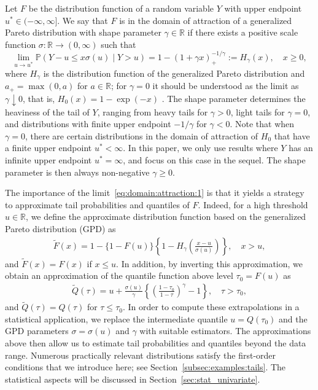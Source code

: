 \documentclass{statsoc}
\theoremstyle{break}
\renewcommand{\P}{\mathbb P}
\newcommand{\tauzero}{\tau_0}
\newcommand{\beam}{\begin{eqnarray}}
\newcommand{\eeam}{\end{eqnarray}\noindent}
\begin{document}
Let $F$ be the distribution function of a random variable $Y$ with upper endpoint $u^* \in (-\infty, \infty]$.
We say that $F$ is in the domain of attraction of a generalized Pareto distribution 
with shape parameter $\gamma \in \mathbb{R}$ 
if there exists a positive scale function $\sigma :\mathbb{R}\to (0,\infty)$ such that 
\begin{equation}
    \label{eq:domain:attraction:1}
\lim_{u \to u^*} \P(Y - u \leq x \sigma(u) \mid  Y > u)  = 1- (1+\gamma x)_+^{-1/\gamma} := H_\gamma(x), \quad  x \geq 0,
\end{equation}
where $H_\gamma$ is the distribution function of the generalized Pareto distribution and $a_+ = \max(0,a)$ for $a\in\mathbb R$; for $\gamma = 0$ it should be understood as the limit as $\gamma \downarrow 0$, that is, $H_0(x) = 1-\exp(-x)$ 
\cite[see, e.g.,][]{balkema:dehaan:1974,pickands:1975}.
The shape parameter determines the heaviness of the tail of $Y$, ranging from heavy tails for $\gamma > 0$, light tails for $\gamma = 0$, and distributions with finite upper endpoint $-1/\gamma$ for $\gamma < 0$.
Note that when $\gamma = 0$, there are certain distributions in the domain of attraction of $H_0$ that have a finite upper endpoint $u^* < \infty$. 
In this paper, we only use results where $Y$ has an infinite upper endpoint $u^* = \infty$, and focus on this case in the sequel. 
The shape parameter is then always non-negative $\gamma \geq 0$. 


The importance of the limit~\eqref{eq:domain:attraction:1} is that it
yields a strategy to approximate tail probabilities and quantiles of $F$.
Indeed, for a high threshold {$u \in \mathbb{R}$,} we define the approximate distribution function based on the generalized Pareto distribution (GPD) as
\beam \label{eq:tail:approximation:tilde:1}
\tilde F(x) = 1 - \{1-F(u)\}\left\{1- H_\gamma\left(\frac{x-u}{\sigma(u)}\right)\right\},\quad x > u,
\eeam 
and $\tilde F(x) = F(x)$ if $x \leq u$.
In addition, by inverting this approximation, we obtain an approximation of the quantile function above level $\tauzero = F(u)$ as 
\beam \label{eq:quantile:tail:approximation}
\tilde Q(\tau) = u  + \frac{\sigma(u)}{\gamma} \left\{ \left(\frac{1-\tauzero}{1-\tau}\right)^{\gamma} - 1 \right\}, \quad \tau > \tauzero,
\eeam 
and $\tilde Q(\tau) = Q(\tau)$ for $\tau \leq \tauzero$. 
In order to compute these extrapolations in a statistical application,
 we replace the intermediate quantile $ u= Q(\tauzero)$ and the GPD parameters $\sigma = \sigma(u)$ and $\gamma$ with suitable estimators. The approximations above then allow us to estimate tail probabilities and quantiles beyond the data range. Numerous practically relevant distributions satisfy the first-order conditions that we introduce here; see Section~\ref{subsec:examples:tails}. 
  The statistical aspects will be discussed in Section~\ref{sec:stat_univariate}. 
\end{document}
